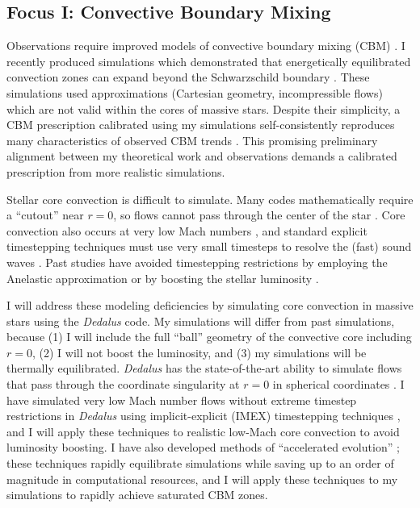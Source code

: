 \documentclass[12pt]{article} %
\begin{document}
\subsection{Focus I: Convective Boundary Mixing} \vspace{-0.15cm}
Observations require improved models of convective boundary mixing (CBM) \citep{johnston2021}.
I recently produced simulations which demonstrated that energetically equilibrated convection zones can expand beyond the Schwarzschild boundary \citep[Fig.~\ref{fig:past_cbm}, bottom panels;][]{anders_etal_2022a}.
These simulations used approximations (Cartesian geometry, incompressible flows) which are not valid within the cores of massive stars.
Despite their simplicity, a CBM prescription calibrated using my simulations self-consistently reproduces many characteristics of observed CBM trends \citep{jermyn_etal_2022_penconv}.
This promising preliminary alignment between my theoretical work and observations demands a calibrated prescription from more realistic simulations.

Stellar core convection is difficult to simulate.
Many codes mathematically require a ``cutout'' near $r = 0$, so flows cannot pass through the center of the star \citep{edelmann_etal_2019,horst_etal_2020,yadav_etal_2016}.
Core convection also occurs at very low Mach numbers \citep[Mach $\sim 10^{-4}$;][]{jermyn_etal_2022_atlas,aerts_etal_2021}, and standard explicit timestepping techniques must use very small timesteps to resolve the (fast) sound waves \citep{edelmann_etal_2021}. 
Past studies have avoided timestepping restrictions by employing the Anelastic approximation \citep[thermodynamically invalid for CBM studies;][]{brown_etal_2012,browning_2008,yadav_etal_2016} or by boosting the stellar luminosity \citep[which leads to unphysical excess CBM;][]{baraffe_etal_2021}.

I will address these modeling deficiencies by simulating core convection in massive stars using the \emph{Dedalus} \citep{burns_etal_2020} code.
My simulations will differ from past simulations, because (1) I will include the full ``ball'' geometry of the convective core including $r = 0$, (2) I will not boost the luminosity, and (3) my simulations will be thermally equilibrated.
\emph{Dedalus} has the state-of-the-art ability to simulate flows that pass through the coordinate singularity at $r = 0$ in spherical coordinates \citep[Fig.~\ref{fig:star}; see also Refs.~][]{vasil_etal_2019,lecoanet_etal_2019}.
I have simulated very low Mach number flows without extreme timestep restrictions in \emph{Dedalus} using implicit-explicit (IMEX) timestepping techniques  \citep{anders_brown_2017}, and I will apply these techniques to realistic low-Mach core convection to avoid luminosity boosting.
I have also developed methods of ``accelerated evolution'' \citep{anders_etal_2018,anders_etal_2020,anders_etal_2022a}; these techniques rapidly equilibrate simulations while saving up to an order of magnitude in computational resources, and I will apply these techniques to my simulations to rapidly achieve saturated CBM zones.
\end{document}
